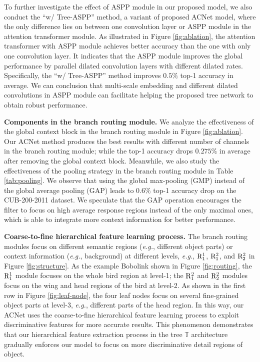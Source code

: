 \documentclass[10pt,twocolumn,letterpaper]{article}
\def\eg{{\em e.g.}}
\begin{document}
To further investigate the effect of ASPP module in our proposed model, we also conduct the ``w/ Tree-ASPP'' method, a variant of proposed ACNet model, where the only difference lies on between one convolution layer or ASPP module in the attention transformer module. As illustrated in Figure \ref{fig:ablation}, the attention transformer with ASPP module achieves better accuracy than the one with only one convolution layer. It indicates that the ASPP module improves the global performance by parallel dilated convolution layers with different dilated rates. Specifically, the ``w/ Tree-ASPP'' method improves $0.5\%$ top-1 accuracy in average. We can conclusion that multi-scale embedding and different dilated convolutions in ASPP module can facilitate helping the proposed tree network to obtain robust performance.

{\flushleft \textbf{Components in the branch routing module.}} We analyze the effectiveness of the global context block \cite{DBLP:journals/corr/abs-1904-11492} in the branch routing module in Figure \ref{fig:ablation}. Our ACNet method produces the best results with different number of channels in the branch routing module; while the top-1 accuracy drops $0.275\%$ in average after removing the global context block. Meanwhile, we also study the effectiveness of the pooling strategy in the branch routing module in Table \ref{tab:pooling}. We observe that using the global max-pooling (GMP) instead of the global average pooling (GAP) leads to $0.6\%$ top-1 accuracy drop on the CUB-200-2011 dataset. We speculate that the GAP operation encourages the filter to focus on high average response regions instead of the only maximal ones, which is able to integrate more context information for better performance.

{\flushleft \textbf{Coarse-to-fine hierarchical feature learning process.}}
The branch routing modules focus on different semantic regions (\eg, different object parts) or context information (\eg, background) at different levels, \eg, ${\rm R}^1_1$, ${\rm R}^2_1$, and ${\rm R}^2_2$ in Figure \ref{fig:structure}. As the example Bobolink shown in Figure \ref{fig:routing}, the ${\rm R}^1_1$ module focuses on the whole bird region at level-1; the ${\rm R}^2_1$ and ${\rm R}^2_2$ modules focus on the wing and head regions of the bird at level-2. As shown in the first row in Figure \ref{fig:leaf-node}, the four leaf nodes focus on several fine-grained object parts at level-3, \eg, different parts of the head region. In this way, our ACNet uses the coarse-to-fine hierarchical feature learning process to exploit discriminative features for more accurate results. This phenomenon demonstrates that our hierarchical feature extraction process in the tree $\mathbb{T}$ architecture gradually enforces our model to focus on more discriminative detail regions of object. 
\end{document}
